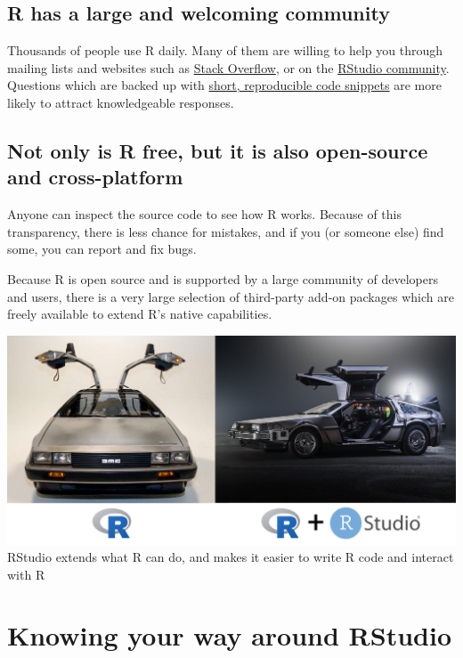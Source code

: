 \documentclass[]{book}
\begin{document}
\subsection{R has a large and welcoming
community}\label{r-has-a-large-and-welcoming-community}

Thousands of people use R daily. Many of them are willing to help you
through mailing lists and websites such as
\href{https://stackoverflow.com/}{Stack Overflow}, or on the
\href{https://community.rstudio.com/}{RStudio community}. Questions
which are backed up with \href{https://www.tidyverse.org/help/}{short,
reproducible code snippets} are more likely to attract knowledgeable
responses.

\subsection{Not only is R free, but it is also open-source and
cross-platform}\label{not-only-is-r-free-but-it-is-also-open-source-and-cross-platform}

Anyone can inspect the source code to see how R works. Because of this
transparency, there is less chance for mistakes, and if you (or someone
else) find some, you can report and fix bugs.

Because R is open source and is supported by a large community of
developers and users, there is a very large selection of third-party
add-on packages which are freely available to extend R's native
capabilities.

\includegraphics{../fig/r+rstudio-analogy.jpg} RStudio extends what R
can do, and makes it easier to write R code and interact with R

\section{Knowing your way around
RStudio}\label{knowing-your-way-around-rstudio}
\end{document}
